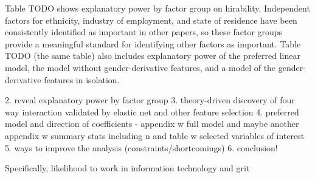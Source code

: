 \documentclass[review]{elsarticle}
\begin{document}



Table TODO shows explanatory power by factor group on hirability.
Independent factors for ethnicity, industry of employment, and state of residence
have been consistently identified as important in other papers,
so these factor groups provide a meaningful standard for identifying other factors as important.
Table TODO (the same table) also includes explanatory power of the preferred linear model,
the model without gender-derivative features,
and a model of the gender-derivative features in isolation.





2. reveal explanatory power by factor group
3. theory-driven discovery of four way interaction validated by elastic net and other feature selection
4. preferred model and direction of coefficients - appendix w full model and maybe another appendix w summary stats including n and table w selected variables of interest
5. ways to improve the analysis (constraints/shortcomings)
6. conclusion!


Specifically, likelihood to work in information technology and grit

\end{document}
